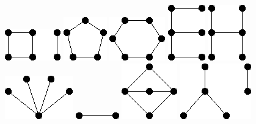 \documentclass[11pt,paper=b5,footinclude,headinclude]{scrbook} %
\begin{document}
\includegraphics[scale=0.5,frame]{smallGraphs/g_C4UP2.png}     
\includegraphics[scale=0.5,frame]{smallGraphs/g_C5.png}     
\includegraphics[scale=0.5,frame]{smallGraphs/g_C6.png}     
\includegraphics[scale=0.5,frame]{smallGraphs/g_E.png}     
\includegraphics[scale=0.5,frame]{smallGraphs/g_H.png}     
\includegraphics[scale=0.5,frame]{smallGraphs/g_K14.png}     
\includegraphics[scale=0.5,frame]{smallGraphs/g_K2.png}     
\includegraphics[scale=0.5,frame]{smallGraphs/g_K23.png}     
\includegraphics[scale=0.5,frame]{smallGraphs/g_K2Uclaw.png}     
\end{document}
